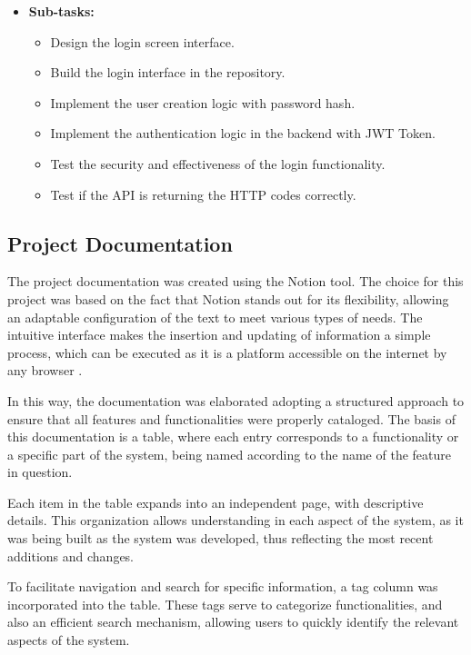 \begin{itemize}
        \item \textbf{Sub-tasks:}
            \begin{itemize}
                \item Design the login screen interface.
                \item Build the login interface in the repository.
                \item Implement the user creation logic with password hash.
                \item Implement the authentication logic in the backend with \gls{JWT} Token.
                \item Test the security and effectiveness of the login functionality.
                \item Test if the \gls{API} is returning the \gls{HTTP} codes correctly.
            \end{itemize}

\end{itemize}



\subsection{Project Documentation}\label{sec:documentation}
The project documentation was created using the Notion tool. The choice for this project was based on the fact that Notion stands out for its flexibility, allowing an adaptable configuration of the text to meet various types of needs. The intuitive interface makes the insertion and updating of information a simple process, which can be executed as it is a platform accessible on the internet by any browser \cite{notionProjectManagement}.

In this way, the documentation was elaborated adopting a structured approach to ensure that all features and functionalities were properly cataloged. The basis of this documentation is a table, where each entry corresponds to a functionality or a specific part of the system, being named according to the name of the feature in question.

Each item in the table expands into an independent page, with descriptive details. This organization allows understanding in each aspect of the system, as it was being built as the system was developed, thus reflecting the most recent additions and changes.

To facilitate navigation and search for specific information, a tag column was incorporated into the table. These tags serve to categorize functionalities, and also an efficient search mechanism, allowing users to quickly identify the relevant aspects of the system.


